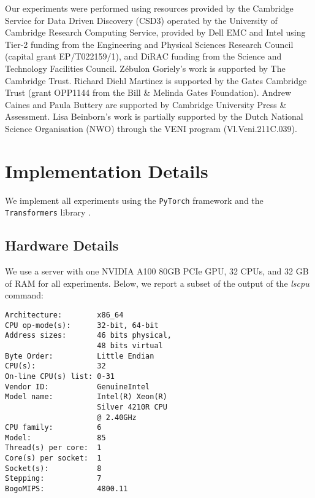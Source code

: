 

Our experiments were performed using resources provided by the Cambridge Service for Data Driven Discovery (CSD3) operated by the University of Cambridge Research Computing Service, provided by Dell EMC and Intel using Tier-2 funding from the Engineering and Physical Sciences Research Council (capital grant EP/T022159/1), and DiRAC funding from the Science and Technology Facilities Council. Z\'ebulon Goriely's work is supported by The Cambridge Trust. Richard Diehl Martinez is supported by the Gates Cambridge Trust (grant OPP1144 from the Bill \& Melinda Gates Foundation). Andrew Caines and Paula Buttery are supported by Cambridge University Press \& Assessment. 
Lisa Beinborn's work is partially supported by the Dutch National Science Organisation (NWO) through the VENI program (Vl.Veni.211C.039).

\section{Implementation Details}\label{app:14-implementation_details}

We implement all experiments using the \texttt{PyTorch} framework \citep{paszke-etal-2019-pytorch} and the \texttt{Transformers} library \citep{wolf-etal-2020-transformers}.

\subsection{Hardware Details}

We use a server with one NVIDIA A100 80GB PCIe GPU, 32 CPUs, and 32 GB of RAM for all experiments. Below, we report a subset of the output of the \emph{lscpu} command:

\begin{tcolorbox}[left=5pt,right=5pt,top=5pt,bottom=5pt]
\small
\begin{verbatim}
Architecture:        x86_64
CPU op-mode(s):      32-bit, 64-bit
Address sizes:       46 bits physical, 
                     48 bits virtual
Byte Order:          Little Endian
CPU(s):              32
On-line CPU(s) list: 0-31
Vendor ID:           GenuineIntel
Model name:          Intel(R) Xeon(R)
                     Silver 4210R CPU
                     @ 2.40GHz
CPU family:          6
Model:               85
Thread(s) per core:  1
Core(s) per socket:  1
Socket(s):           8
Stepping:            7
BogoMIPS:            4800.11
\end{verbatim}
\end{tcolorbox}

